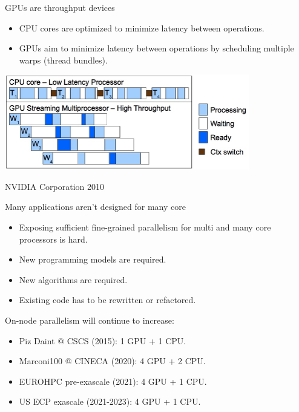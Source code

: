 \documentclass[aspectratio=43]{beamer}
\begin{document}
\begin{frame}[fragile]{GPUs are throughput devices}
    \begin{itemize}
        \item CPU cores are optimized to minimize latency between operations.
        \item GPUs aim to minimize latency between operations by scheduling multiple warps (thread bundles).
    \end{itemize}
    \begin{center}
        \includegraphics[width=0.8\textwidth]{./images/latency.jpg}
    \end{center}
    \footnotesize \textcopyright NVIDIA Corporation 2010
\end{frame}

\begin{frame}[fragile]{Many applications aren't designed for many core}
    \begin{itemize}
        \item Exposing sufficient fine-grained parallelism for multi and many core processors is hard.
        \item New programming models are required.
        \item New algorithms are required.
        \item Existing code has to be rewritten or refactored.
    \end{itemize}

    On-node parallelism will continue to increase:
    \begin{itemize}
        \item Piz Daint @ CSCS (2015): 1 GPU + 1 CPU.
        \item Marconi100 @ CINECA (2020): 4 GPU + 2 CPU.
        \item EUROHPC pre-exascale (2021): 4 GPU + 1 CPU.
        \item US ECP exascale (2021-2023): 4 GPU + 1 CPU.
    \end{itemize}
\end{frame}
\end{document}
